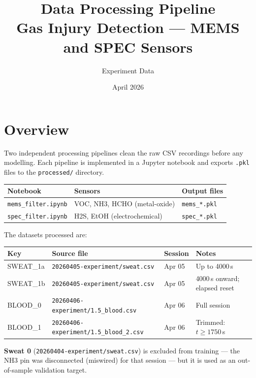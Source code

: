 \documentclass[11pt,a4paper]{article}
\title{\textbf{Data Processing Pipeline} \\[0.5em]
       \large Gas Injury Detection --- MEMS and SPEC Sensors}
\author{Experiment Data}
\date{April 2026}
\begin{document}
\maketitle
\tableofcontents
\newpage

\section{Overview}

Two independent processing pipelines clean the raw CSV recordings before
any modelling.  Each pipeline is implemented in a Jupyter notebook and
exports \texttt{.pkl} files to the \texttt{processed/} directory.

\begin{center}
\begin{tabular}{lll}
\toprule
Notebook & Sensors & Output files \\
\midrule
\texttt{mems\_filter.ipynb} & VOC, NH3, HCHO (metal-oxide) & \texttt{mems\_*.pkl} \\
\texttt{spec\_filter.ipynb} & H2S, EtOH (electrochemical) & \texttt{spec\_*.pkl} \\
\bottomrule
\end{tabular}
\end{center}

The datasets processed are:

\begin{center}
\begin{tabular}{llll}
\toprule
Key & Source file & Session & Notes \\
\midrule
SWEAT\_1a & \texttt{20260405-experiment/sweat.csv} & Apr 05 & Up to 4000\,s \\
SWEAT\_1b & \texttt{20260405-experiment/sweat.csv} & Apr 05 & 4000\,s onward; elapsed reset \\
BLOOD\_0  & \texttt{20260406-experiment/1.5\_blood.csv}   & Apr 06 & Full session \\
BLOOD\_1  & \texttt{20260406-experiment/1.5\_blood\_2.csv} & Apr 06 & Trimmed: $t \geq 1750$\,s \\
\bottomrule
\end{tabular}
\end{center}

\textbf{Sweat 0} (\texttt{20260404-experiment/sweat.csv}) is excluded from
training --- the NH3 pin was disconnected (miswired) for that session ---
but it is used as an out-of-sample validation target.
\end{document}

